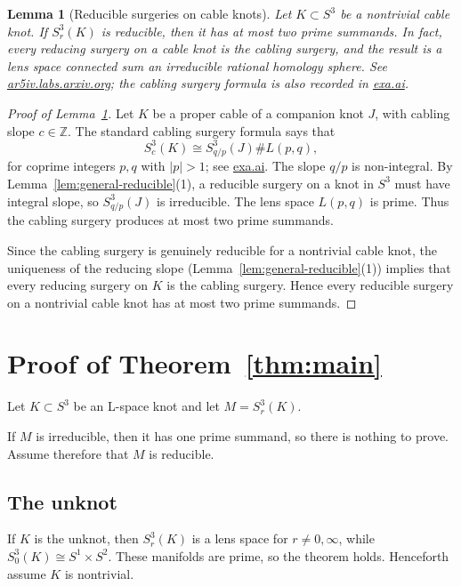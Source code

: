 \documentclass{article}
\newtheorem{lemma}[theorem]{Lemma}
\theoremstyle{definition}
\begin{document}
\begin{lemma}[Reducible surgeries on cable knots]
\label{lem:cable}
Let \(K\subset S^{3}\) be a nontrivial cable knot.  If
\(S^{3}_{r}(K)\) is reducible, then it has at most two prime summands.
In fact, every reducing surgery on a cable knot is the cabling surgery, and
the result is a lens space connected sum an irreducible rational homology
sphere.  See
\href{https://ar5iv.labs.arxiv.org/html/1507.04562}{ar5iv.labs.arxiv.org};
the cabling surgery formula is also recorded in
\href{https://exa.ai/library/publication/zl1m8jt741b}{exa.ai}.
\end{lemma}

\begin{proof}[Proof of Lemma~\ref{lem:cable}]
Let \(K\) be a proper cable of a companion knot \(J\), with cabling slope
\(c\in\mathbb{Z}\).  The standard cabling surgery formula says that
\[
  S^{3}_{c}(K)\cong S^{3}_{q/p}(J)\# L(p,q),
\]
for coprime integers \(p,q\) with \(|p|>1\); see
\href{https://exa.ai/library/publication/zl1m8jt741b}{exa.ai}.
The slope \(q/p\) is non-integral.  By Lemma~\ref{lem:general-reducible}(1),
a reducible surgery on a knot in \(S^{3}\) must have integral slope, so
\(S^{3}_{q/p}(J)\) is irreducible.  The lens space \(L(p,q)\) is prime.
Thus the cabling surgery produces at most two prime summands.

Since the cabling surgery is genuinely reducible for a nontrivial cable knot,
the uniqueness of the reducing slope
(Lemma~\ref{lem:general-reducible}(1)) implies that every reducing surgery on
\(K\) is the cabling surgery.  Hence every reducible surgery on a nontrivial
cable knot has at most two prime summands.
\end{proof}

\section{Proof of Theorem~\ref{thm:main}}

Let \(K\subset S^{3}\) be an L-space knot and let \(M=S^{3}_{r}(K)\).

If \(M\) is irreducible, then it has one prime summand, so there is nothing to
prove.  Assume therefore that \(M\) is reducible.

\subsection*{The unknot}
If \(K\) is the unknot, then \(S^{3}_{r}(K)\) is a lens space for
\(r\neq 0,\infty\), while \(S^{3}_{0}(K)\cong S^{1}\times S^{2}\).  These
manifolds are prime, so the theorem holds.  Henceforth assume \(K\) is
nontrivial.
\end{document}
